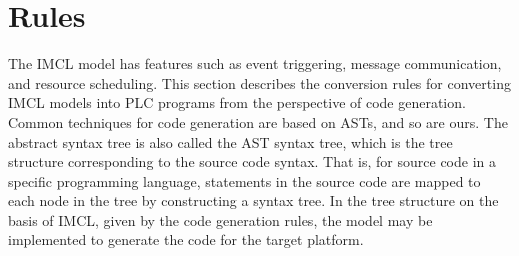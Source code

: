 \section{Rules}
The IMCL model has features such as event triggering, message communication, and resource scheduling. This section describes the conversion rules for converting IMCL models into PLC programs from the perspective of code generation. Common techniques for code generation are based on ASTs, and so are ours. The abstract syntax tree is also called the AST syntax tree, which is the tree structure corresponding to the source code syntax. That is, for source code in a specific programming language, statements in the source code are mapped to each node in the tree by constructing a syntax tree. In the tree structure on the basis of IMCL, given by the code generation rules, the model may be implemented to generate the code for the target platform.


 